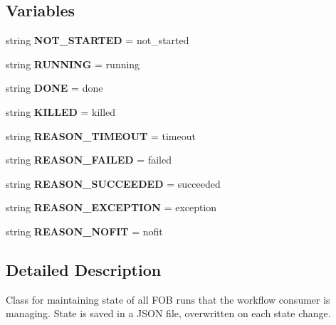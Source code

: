 \subsection*{Variables}
\begin{DoxyCompactItemize}
\item 
\mbox{\label{namespacecodar_1_1savanna_1_1status_aa4522e2cf19460b7517dbdb19568fbf0}} 
string {\bfseries N\+O\+T\+\_\+\+S\+T\+A\+R\+T\+ED} = \textquotesingle{}not\+\_\+started\textquotesingle{}
\item 
\mbox{\label{namespacecodar_1_1savanna_1_1status_ad7ccda5533ae3cb311396ebb9cd64bd1}} 
string {\bfseries R\+U\+N\+N\+I\+NG} = \textquotesingle{}running\textquotesingle{}
\item 
\mbox{\label{namespacecodar_1_1savanna_1_1status_a9a1b345dbe99c209b1418a3f308681ae}} 
string {\bfseries D\+O\+NE} = \textquotesingle{}done\textquotesingle{}
\item 
\mbox{\label{namespacecodar_1_1savanna_1_1status_abcf9c4af3cc2cbc09d14fb564bb0245a}} 
string {\bfseries K\+I\+L\+L\+ED} = \textquotesingle{}killed\textquotesingle{}
\item 
\mbox{\label{namespacecodar_1_1savanna_1_1status_aa0bb0febd185a721cf123fd2d1c3b4d9}} 
string {\bfseries R\+E\+A\+S\+O\+N\+\_\+\+T\+I\+M\+E\+O\+UT} = \textquotesingle{}timeout\textquotesingle{}
\item 
\mbox{\label{namespacecodar_1_1savanna_1_1status_ab0ffd438e5ed72d21826960e5b826d80}} 
string {\bfseries R\+E\+A\+S\+O\+N\+\_\+\+F\+A\+I\+L\+ED} = \textquotesingle{}failed\textquotesingle{}
\item 
\mbox{\label{namespacecodar_1_1savanna_1_1status_a0f7420e1be47c3bc60b07f00980e7081}} 
string {\bfseries R\+E\+A\+S\+O\+N\+\_\+\+S\+U\+C\+C\+E\+E\+D\+ED} = \textquotesingle{}succeeded\textquotesingle{}
\item 
\mbox{\label{namespacecodar_1_1savanna_1_1status_a7c8ef2fede28de1fd3fce1b098deca74}} 
string {\bfseries R\+E\+A\+S\+O\+N\+\_\+\+E\+X\+C\+E\+P\+T\+I\+ON} = \textquotesingle{}exception\textquotesingle{}
\item 
\mbox{\label{namespacecodar_1_1savanna_1_1status_a0a4ce01e1307aeaba51d5e4267704177}} 
string {\bfseries R\+E\+A\+S\+O\+N\+\_\+\+N\+O\+F\+IT} = \textquotesingle{}nofit\textquotesingle{}
\end{DoxyCompactItemize}


\subsection{Detailed Description}
\begin{DoxyVerb}Class for maintaining state of all FOB runs that the workflow consumer is
managing. State is saved in a JSON file, overwritten on each state change.
\end{DoxyVerb}
 